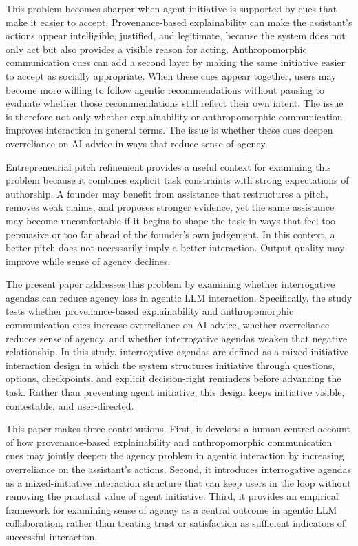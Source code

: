 \documentclass[sigconf,review,anonymous]{acmart}
\begin{document}
This problem becomes sharper when agent initiative is supported by cues that make it easier to accept. Provenance-based explainability can make the assistant’s actions appear intelligible, justified, and legitimate, because the system does not only act but also provides a visible reason for acting. Anthropomorphic communication cues can add a second layer by making the same initiative easier to accept as socially appropriate. When these cues appear together, users may become more willing to follow agentic recommendations without pausing to evaluate whether those recommendations still reflect their own intent. The issue is therefore not only whether explainability or anthropomorphic communication improves interaction in general terms. The issue is whether these cues deepen overreliance on AI advice in ways that reduce sense of agency.

Entrepreneurial pitch refinement provides a useful context for examining this problem because it combines explicit task constraints with strong expectations of authorship. A founder may benefit from assistance that restructures a pitch, removes weak claims, and proposes stronger evidence, yet the same assistance may become uncomfortable if it begins to shape the task in ways that feel too persuasive or too far ahead of the founder’s own judgement. In this context, a better pitch does not necessarily imply a better interaction. Output quality may improve while sense of agency declines.

The present paper addresses this problem by examining whether interrogative agendas can reduce agency loss in agentic LLM interaction. Specifically, the study tests whether provenance-based explainability and anthropomorphic communication cues increase overreliance on AI advice, whether overreliance reduces sense of agency, and whether interrogative agendas weaken that negative relationship. In this study, interrogative agendas are defined as a mixed-initiative interaction design in which the system structures initiative through questions, options, checkpoints, and explicit decision-right reminders before advancing the task. Rather than preventing agent initiative, this design keeps initiative visible, contestable, and user-directed.

This paper makes three contributions. First, it develops a human-centred account of how provenance-based explainability and anthropomorphic communication cues may jointly deepen the agency problem in agentic interaction by increasing overreliance on the assistant’s actions. Second, it introduces interrogative agendas as a mixed-initiative interaction structure that can keep users in the loop without removing the practical value of agent initiative. Third, it provides an empirical framework for examining sense of agency as a central outcome in agentic LLM collaboration, rather than treating trust or satisfaction as sufficient indicators of successful interaction.
\end{document}
